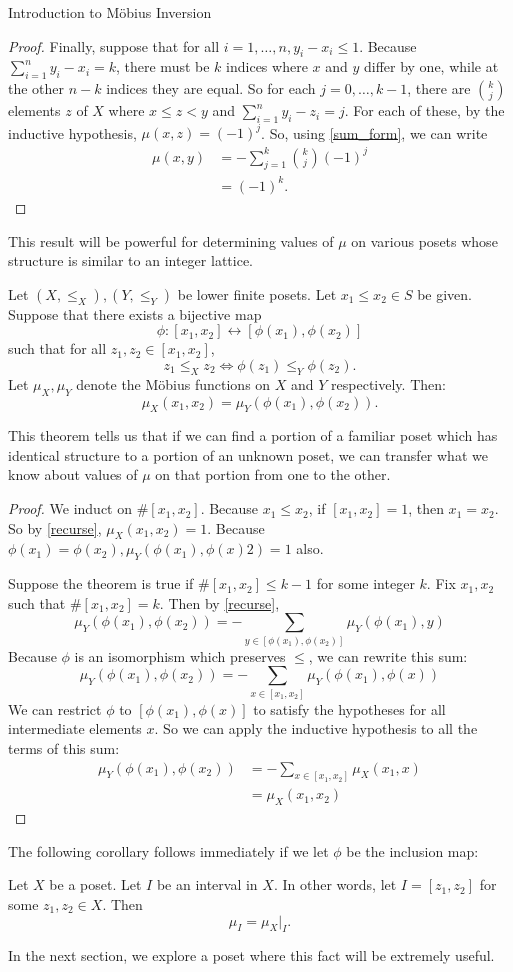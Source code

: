 \documentclass[12pt]{pom_thesis}
\begin{document}
\begin{chapter}{Introduction to M\"obius Inversion}
\begin{proof}
Finally, suppose that for all $i = 1,\dots,n, y_i-x_i \leq 1$. Because $\sum_{i=1}^ny_i-x_i =k$, there must be $k$ indices where $x$ and $y$ differ by one, while at the other $n-k$ indices they are equal. So for each $j = 0,\dots,k-1$, there are $k \choose j$ elements $z$ of $X$ where $x \leq z < y$ and $\sum_{i = 1}^n y_i-z_i = j$. For each of these, by the inductive hypothesis, $\mu(x,z) = (-1)^j$. So, using \ref{sum_form}, we can write
\begin{align*}
\mu(x,y)& = -\sum_{j = 1}^k {k \choose j} (-1)^j\\
&= (-1)^k.
\end{align*}
\end{proof}
This result will be powerful for determining values of $\mu$ on various posets whose structure is similar to an integer lattice. 
\begin{thm}\label{mapping}
Let $(X, \leq_X),(Y, \leq_Y)$ be lower finite posets. Let $x_1 \leq x_2 \in S$ be given. Suppose that there exists a bijective map
\[
\phi: [x_1, x_2] \leftrightarrow [\phi(x_1), \phi(x_2)]
\]
such that for all $z_1, z_2 \in [x_1, x_2]$,
\[ 
z_1 \leq_X z_2 \iff \phi(z_1) \leq_Y \phi(z_2).
\] 
Let $\mu_X, \mu_Y$ denote the M\"obius functions on $X$ and $Y$ respectively. Then:
\[
\mu_X(x_1, x_2) = \mu_Y(\phi(x_1), \phi(x_2)).
\]
\end{thm}
This theorem tells us that if we can find a portion of a familiar poset which has identical structure to a portion of an unknown poset, we can transfer what we know about values of $\mu$ on that portion from one to the other.
\begin{proof}
We induct on $\#[x_1, x_2]$. Because $x_1 \leq x_2$, if $[x_1, x_2] = 1$, then $x_1 = x_2$. So by \ref{recurse}, $\mu_X(x_1, x_2) = 1$. Because $\phi(x_1) = \phi(x_2), \mu_Y(\phi(x_1), \phi(x)2) = 1$ also.

Suppose the theorem is true if $\#[x_1, x_2] \leq k-1$ for some integer $k$. Fix $x_1, x_2$ such that $\#[x_1, x_2] = k$. Then by \ref{recurse},
\[
\mu_Y(\phi(x_1), \phi(x_2)) = -\sum_{y \in [\phi(x_1), \phi(x_2)]}\mu_Y(\phi(x_1), y)
\]
Because $\phi$ is an isomorphism which preserves $\leq$, we can rewrite this sum:
\[
\mu_Y(\phi(x_1), \phi(x_2)) = -\sum_{x \in [x_1, x_2]}\mu_Y(\phi(x_1), \phi(x))
\]
We can restrict $\phi$ to $[\phi(x_1), \phi(x)]$ to satisfy the hypotheses for all intermediate elements $x$. So we can apply the inductive hypothesis to all the terms of this sum:
\begin{align*}
\mu_Y(\phi(x_1), \phi(x_2)) &= -\sum_{x \in [x_1, x_2]}\mu_X(x_1, x)\\
&= \mu_X(x_1, x_2)
\end{align*}
\end{proof}
The following corollary follows immediately if we let $\phi$ be the inclusion map:
\begin{cor}\label{subset}
Let $X$ be a poset. Let $I$ be an interval in $X$. In other words, let $I = [z_1, z_2]$ for some $z_1, z_2 \in X$. Then
\[
\mu_I = \mu_X|_I.
\]
\end{cor}
In the next section, we explore a poset where this fact will be extremely useful. 


\end{chapter}
\end{document}
